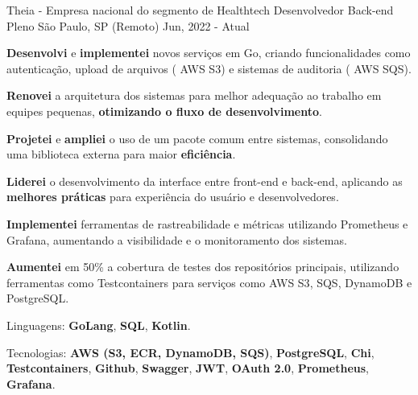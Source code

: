 
\begin{cventries}
  \cventry
  {Theia - Empresa nacional do segmento de Healthtech} %
  {Desenvolvedor Back-end Pleno} %
  {São Paulo, SP (Remoto)} %
  {Jun, 2022 - Atual} %
  {
    \begin{cvitems}
      \item {\textbf{Desenvolvi} e \textbf{implementei} novos serviços em  {Go}, criando funcionalidades como autenticação, upload de arquivos ( {AWS S3}) e sistemas de auditoria ( {AWS SQS}).}
      \item {\textbf{Renovei} a arquitetura dos sistemas para melhor adequação ao trabalho em equipes pequenas, \textbf{otimizando o fluxo de desenvolvimento}.}
      \item {\textbf{Projetei} e \textbf{ampliei} o uso de um pacote comum entre sistemas, consolidando uma biblioteca externa para maior \textbf{eficiência}.}
      \item {\textbf{Liderei} o desenvolvimento da interface entre front-end e back-end, aplicando as \textbf{melhores práticas} para experiência do usuário e desenvolvedores.}
      \item {\textbf{Implementei} ferramentas de rastreabilidade e métricas utilizando {Prometheus} e {Grafana}, aumentando a visibilidade e o monitoramento dos sistemas.}
      \item {\textbf{Aumentei} em 50\% a cobertura de testes dos repositórios principais, utilizando ferramentas como {Testcontainers} para serviços como {AWS S3}, {SQS}, {DynamoDB} e {PostgreSQL}.}
      \item {Linguagens: \textbf{GoLang}, \textbf{SQL}, \textbf{Kotlin}.}
      \item {Tecnologias: \textbf{AWS (S3, ECR, DynamoDB, SQS)}, \textbf{PostgreSQL}, \textbf{Chi}, \textbf{Testcontainers}, \textbf{Github}, \textbf{Swagger}, \textbf{JWT}, \textbf{OAuth 2.0}, \textbf{Prometheus}, \textbf{Grafana}.}
    \end{cvitems}
  }


\end{cventries}
